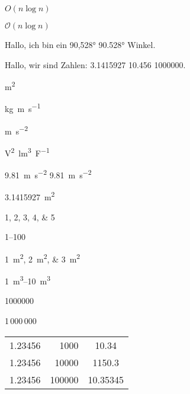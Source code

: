 \documentclass[20pt,ngerman]{scrartcl}
\begin{document}
$O(n\log{}n)$ %
 
$\mathcal{O}(n\log{}n)$ %



Hallo, ich bin ein \ang{90,528} \ang{90.528} Winkel.

Hallo, wir sind Zahlen: \num{3,1415927} \num{10,456} \num{1000000}.

\si{m^2}

\si{kg.m.s^{-1}}

\si{\metre \per  \second^2}

\si{\square\volt\cubic\lumen\per\farad}


\SI{9,81}{m.s^{-2}} \SI{9,81}{m\per \second^2}

\SI{3,1415927}{m^2}


\numlist{1;2;3;4;5}

\numrange{1}{100}

\SIlist{1;2;3}{m^2}

\SIrange{1}{10}{m^3}

\num{1000000}

1\,000\,000

\vspace*{1cm}
\begin{tabular}{lrS}
1.23456 & 1000     & 10.34 \\
1.23456 & 10000   & 1150.3 \\ 
1.23456 & 100000 & 10.35345 \\
\end{tabular}
\end{document}
